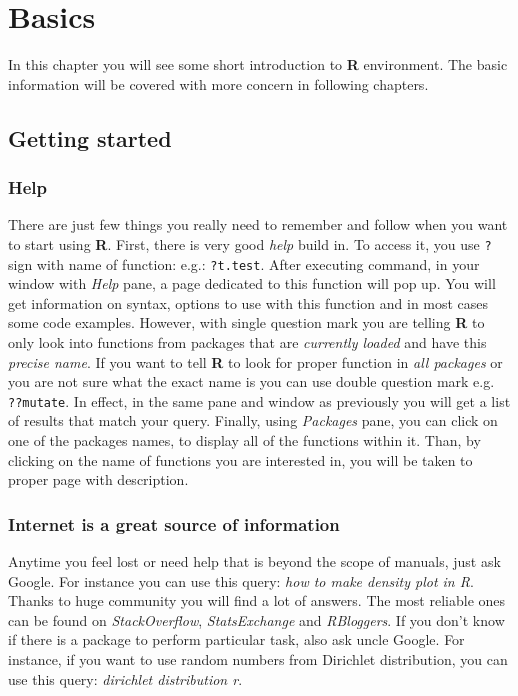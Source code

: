 \documentclass[]{book}
\theoremstyle{definition}
\theoremstyle{definition}
\theoremstyle{definition}
\theoremstyle{remark}
\begin{document}
\chapter{Basics}\label{basics}

In this chapter you will see some short introduction to \textbf{R}
environment. The basic information will be covered with more concern in
following chapters.

\section{Getting started}\label{getting-started}

\subsection{Help}\label{help}

There are just few things you really need to remember and follow when
you want to start using \textbf{R}. First, there is very good
\emph{help} build in. To access it, you use \texttt{?} sign with name of
function: e.g.: \texttt{?t.test}. After executing command, in your
window with \emph{Help} pane, a page dedicated to this function will pop
up. You will get information on syntax, options to use with this
function and in most cases some code examples. However, with single
question mark you are telling \textbf{R} to only look into functions
from packages that are \emph{currently loaded} and have this
\emph{precise name}. If you want to tell \textbf{R} to look for proper
function in \emph{all packages} or you are not sure what the exact name
is you can use double question mark e.g. \texttt{??mutate}. In effect,
in the same pane and window as previously you will get a list of results
that match your query. Finally, using \emph{Packages} pane, you can
click on one of the packages names, to display all of the functions
within it. Than, by clicking on the name of functions you are interested
in, you will be taken to proper page with description.

\subsection{Internet is a great source of
information}\label{internet-is-a-great-source-of-information}

Anytime you feel lost or need help that is beyond the scope of manuals,
just ask Google. For instance you can use this query: \emph{how to make
density plot in R}. Thanks to huge community you will find a lot of
answers. The most reliable ones can be found on \emph{StackOverflow},
\emph{StatsExchange} and \emph{RBloggers}. If you don't know if there is
a package to perform particular task, also ask uncle Google. For
instance, if you want to use random numbers from Dirichlet distribution,
you can use this query: \emph{dirichlet distribution r}.
\end{document}
